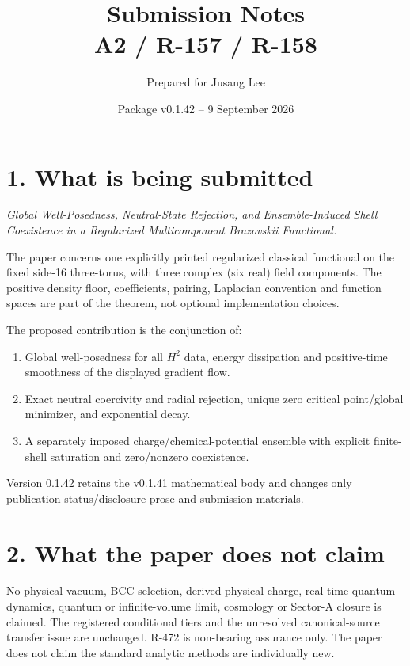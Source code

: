 \documentclass[11pt]{article}
\title{Submission Notes\\\large A2 / R-157 / R-158}
\author{Prepared for Jusang Lee}
\date{Package v0.1.42 -- 9 September 2026}
\begin{document}
\maketitle
\begin{center}
\end{center}

\section*{1. What is being submitted}
\textit{Global Well-Posedness, Neutral-State Rejection, and Ensemble-Induced
Shell Coexistence in a Regularized Multicomponent Brazovskii Functional.}

The paper concerns one explicitly printed regularized classical functional on
the fixed side-16 three-torus, with three complex (six real) field components.
The positive density floor, coefficients, pairing, Laplacian convention and
function spaces are part of the theorem, not optional implementation choices.

The proposed contribution is the conjunction of:
\begin{enumerate}[leftmargin=*]
\item Global well-posedness for all $H^2$ data, energy dissipation and
positive-time smoothness of the displayed gradient flow.
\item Exact neutral coercivity and radial rejection, unique zero critical
point/global minimizer, and exponential decay.
\item A separately imposed charge/chemical-potential ensemble with explicit
finite-shell saturation and zero/nonzero coexistence.
\end{enumerate}
Version 0.1.42 retains the v0.1.41 mathematical body and changes only
publication-status/disclosure prose and submission materials.

\section*{2. What the paper does not claim}
No physical vacuum, BCC selection, derived physical charge, real-time quantum
dynamics, quantum or infinite-volume limit, cosmology or Sector-A closure is
claimed. The registered conditional tiers and the unresolved canonical-source
transfer issue are unchanged. R-472 is non-bearing assurance only. The paper
does not claim the standard analytic methods are individually new.
\end{document}
